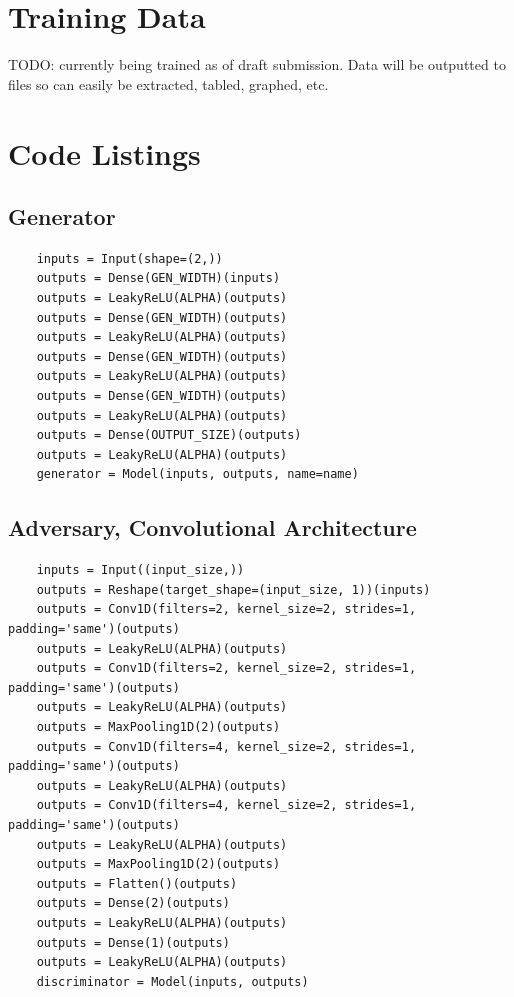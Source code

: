 \documentclass[12pt, titlepage]{report}
\theoremstyle{definition}
\begin{document}




\appendix
\chapter{Training Data}
TODO: currently being trained as of draft submission. Data will be outputted to files so can easily be extracted, tabled, graphed, etc.

\chapter{Code Listings}
\section{Generator}\label{appendix:generator}
\begin{verbatim}
    inputs = Input(shape=(2,))
    outputs = Dense(GEN_WIDTH)(inputs)
    outputs = LeakyReLU(ALPHA)(outputs)
    outputs = Dense(GEN_WIDTH)(outputs)
    outputs = LeakyReLU(ALPHA)(outputs)
    outputs = Dense(GEN_WIDTH)(outputs)
    outputs = LeakyReLU(ALPHA)(outputs)
    outputs = Dense(GEN_WIDTH)(outputs)
    outputs = LeakyReLU(ALPHA)(outputs)
    outputs = Dense(OUTPUT_SIZE)(outputs)
    outputs = LeakyReLU(ALPHA)(outputs)
    generator = Model(inputs, outputs, name=name)
\end{verbatim} 

\section{Adversary, Convolutional Architecture}\label{appendix:convolutional}
\begin{verbatim}
    inputs = Input((input_size,))
    outputs = Reshape(target_shape=(input_size, 1))(inputs)
    outputs = Conv1D(filters=2, kernel_size=2, strides=1, padding='same')(outputs)
    outputs = LeakyReLU(ALPHA)(outputs)
    outputs = Conv1D(filters=2, kernel_size=2, strides=1, padding='same')(outputs)
    outputs = LeakyReLU(ALPHA)(outputs)
    outputs = MaxPooling1D(2)(outputs)
    outputs = Conv1D(filters=4, kernel_size=2, strides=1, padding='same')(outputs)
    outputs = LeakyReLU(ALPHA)(outputs)
    outputs = Conv1D(filters=4, kernel_size=2, strides=1, padding='same')(outputs)
    outputs = LeakyReLU(ALPHA)(outputs)
    outputs = MaxPooling1D(2)(outputs)
    outputs = Flatten()(outputs)
    outputs = Dense(2)(outputs)
    outputs = LeakyReLU(ALPHA)(outputs)
    outputs = Dense(1)(outputs)
    outputs = LeakyReLU(ALPHA)(outputs)
    discriminator = Model(inputs, outputs)
\end{verbatim}
\end{document}
